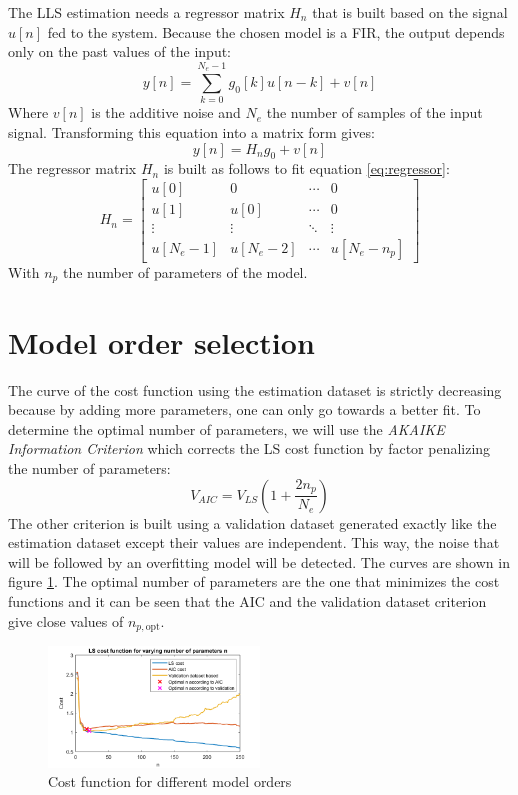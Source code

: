 \documentclass[10pt,twocolumn]{article}
\begin{document}
The LLS estimation needs a regressor matrix $H_n$ that is built based on the signal $u[n]$ fed to the system. Because the chosen model is a FIR, the output depends only on the past values of the input:
\begin{equation}
    \label{eq:regressor}
    y[n] = \sum_{k=0}^{N_e-1} g_0[k] u[n-k] + v[n]
\end{equation}
Where $v[n]$ is the additive noise and $N_e$ the number of samples of the input signal. Transforming this equation into a matrix form gives:
\begin{equation}
    y[n] = H_n g_0 + v[n]
\end{equation}
The regressor matrix $H_n$ is built as follows to fit equation \ref{eq:regressor}:
\begin{equation}
    H_n = \begin{bmatrix}
        u[0] & 0 & \cdots & 0 \\
        u[1] & u[0] & \cdots & 0 \\
        \vdots & \vdots & \ddots & \vdots \\
        u[N_e-1] & u[N_e-2] & \cdots & u[N_e-n_p]
    \end{bmatrix}
\end{equation}
With $n_p$ the number of parameters of the model.

\section{Model order selection}

The curve of the cost function using the estimation dataset is strictly decreasing because by adding more parameters, one can only go towards a better fit. To determine the optimal number of parameters, we will use the \textit{AKAIKE Information Criterion} which corrects the LS cost function by factor penalizing the number of parameters:
\begin{equation}
    V_{AIC} = V_{LS} \left(1+\frac{2n_p}{N_e}\right)
\end{equation}
The other criterion is built using a validation dataset generated exactly like the estimation dataset except their values are independent. This way, the noise that will be followed by an overfitting model will be detected. The curves are shown in figure \ref{fig:costFunction}. The optimal number of parameters are the one that minimizes the cost functions and it can be seen that the AIC and the validation dataset criterion give close values of $n_{p, \text{opt}}$.
\begin{figure}
    \centering
    \includegraphics[width=0.5\textwidth]{pic/cost.png}
    \caption{Cost function for different model orders}
    \label{fig:costFunction}
\end{figure}
\end{document}
